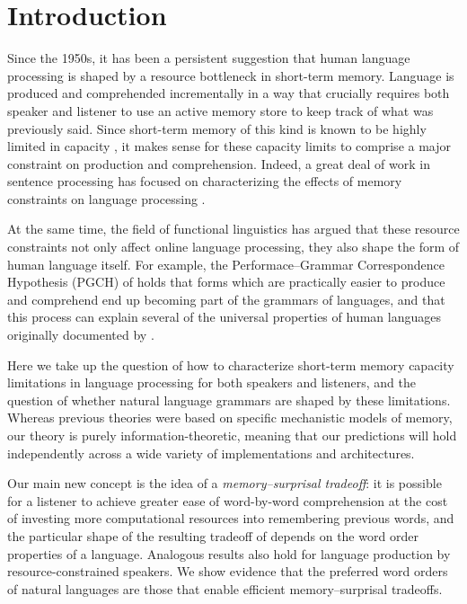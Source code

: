 \documentclass[11pt,letterpaper]{article}
\begin{document}
 
\section{Introduction}

Since the 1950s, it has been a persistent suggestion that human language processing is shaped by a resource bottleneck in short-term memory.
Language is produced and comprehended incrementally in a way that crucially requires both speaker and listener to use an active memory store to keep track of what was previously said.
Since short-term memory of this kind is known to be highly limited in capacity \citep{miller1956magical}, it makes sense for these capacity limits to comprise a major constraint on production and comprehension.
Indeed, a great deal of work in sentence processing has focused on characterizing the effects of memory constraints on language processing \citep{gibson-linguistic-1998,lewis-activation-based-2005,levy2013memory}.

At the same time, the field of functional linguistics has argued that these resource constraints not only affect online language processing, they also shape the form of human language itself.
For example, the Performace--Grammar Correspondence Hypothesis (PGCH) of \citet{hawkins1994performance} holds that forms which are practically easier to produce and comprehend end up becoming part of the grammars of languages, and that this process can explain several of the universal properties of human languages originally documented by \citet{greenberg-universals-1963}.

Here we take up the question of how to characterize short-term memory capacity limitations in language processing for both speakers and listeners, and the question of whether natural language grammars are shaped by these limitations.
Whereas previous theories were based on specific mechanistic models of memory, our theory is purely information-theoretic, meaning that our predictions will hold independently across a wide variety of implementations and architectures.

Our main new concept is the idea of a \emph{memory--surprisal tradeoff}: it is possible for a listener to achieve greater ease of word-by-word comprehension at the cost of investing more computational resources into remembering previous words, and the particular shape of the resulting tradeoff of depends on the word order properties of a language. Analogous results also hold for language production by resource-constrained speakers. We show evidence that the preferred word orders of natural languages are those that enable efficient memory--surprisal tradeoffs.
\end{document}
